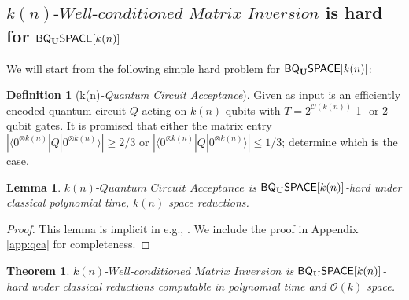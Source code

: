 \documentclass[11pt]{article}
\newtheorem{theorem}{Theorem}
\newtheorem{lemma}{Lemma}
\theoremstyle{definition}
\theoremstyle{remark}
\theoremstyle{definition}
\newtheorem{definition}{Definition}
\newcommand\matrixinvert[1]{{\ensuremath{#1}}\textit{-Well-conditioned Matrix Inversion}}
\newcommand\qca[1]{#1\textit{-Quantum Circuit Acceptance}}
\newcommand{\zero}{\ensuremath{0^{\otimes{k(n)}}}}
\newcommand{\classfont}{\sf}
\newcommand{\Unitary}{\mathbf{U}}
\newcommand{\unitaryBQSPACE}[1]{{\classfont{BQ}_\Unitary\classfont{SPACE}}[#1]}
\newcommand\bigoh{\mathcal{O}}
\begin{document}
\subsection{$\matrixinvert{k(n)}$ is hard for $\unitaryBQSPACE{k(n)}$}
We will start from the following simple hard problem for $\unitaryBQSPACE{k(n)}$:
\begin{definition}[\qca{k(n)}]
	Given as input is an efficiently encoded quantum circuit $Q$ acting on $k(n)$ qubits with $T = 2^{\mathcal{O}(k(n))}$ 1- or 2-qubit gates.  It is promised that either the matrix entry $|\langle {\zero}|Q|{\zero}\rangle| \geq 2/3$ or $|\langle {\zero}|Q|{\zero}\rangle| \leq 1/3$; determine which is the case.
\end{definition}
\begin{lemma}
	$\qca{k(n)}$ is $\unitaryBQSPACE{k(n)}$-hard under classical polynomial time, $k(n)$ space reductions.
\end{lemma}
\begin{proof}This lemma is implicit in e.g., \cite{bbbv,dawsonnielsen}.  We include the proof in Appendix \ref{app:qca} for completeness.
\end{proof}
\begin{theorem}
$\matrixinvert{k(n)}$ is $\unitaryBQSPACE{k(n)}$-hard under classical reductions computable in polynomial time and $\bigoh (k)$ space.
\end{theorem}
\end{document}
